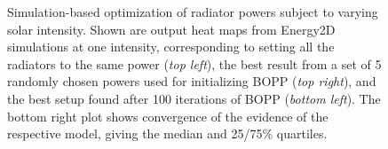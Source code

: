 \begin{figure}[t]
{		Simulation-based optimization of radiator powers subject to varying solar intensity. Shown are output heat maps from Energy2D \citep{xie2012energy2d} simulations at one intensity, corresponding to setting all the radiators to the same power (\emph{top left}), the best result from a set of 5 randomly chosen powers used for initializing BOPP (\emph{top right}), and the best setup found after 100 iterations of BOPP (\emph{bottom left}). The bottom right plot shows convergence of the evidence of the respective model, giving the median and 25/75\% quartiles.
}
\end{figure}
